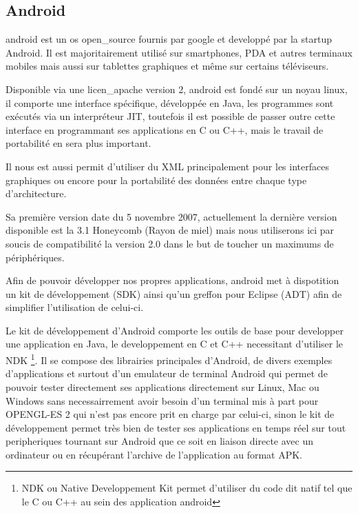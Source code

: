 \subsection{Android}

	\gls{android} est un \gls{os} \gls{open_source} fournis par \gls{google} et
	developpé par la startup Android.
	Il est majoritairement utilisé sur smartphones, PDA et autres terminaux
	mobiles mais aussi sur tablettes graphiques et même sur certains téléviseurs.
	
	Disponible via une \gls{licen_apache} version 2, \gls{android} est fondé sur un noyau \gls{linux}, il comporte une interface
	spécifique, développée en Java, les programmes sont exécutés via un
	interpréteur JIT, toutefois il est possible de passer outre cette interface en
	programmant ses applications en C ou C++, mais le travail de portabilité en
	sera plus important.
	
	Il nous est aussi permit d'utiliser du XML principalement pour les interfaces
	graphiques ou encore pour la portabilité des données entre chaque type
	d'architecture.
	
	Sa première version date du 5 novembre 2007, actuellement la dernière version
	disponible est la 3.1 Honeycomb (Rayon de miel) mais nous utiliserons ici par
	soucis de compatibilité la version 2.0 dans le but de toucher un maximums de
	périphériques.
	
	Afin de pouvoir développer nos propres applications, \gls{android} met à
	dispotition un kit de développement (SDK) ainsi qu'un greffon pour Eclipse
	(ADT) afin de simplifier l'utilisation de celui-ci.
	
	Le kit de développement d'Android comporte les outils de base pour developper une application en
	Java, le developpement en C et C++ necessitant d'utiliser le NDK \footnote{NDK
	ou Native Developpement Kit permet d'utiliser du code dit natif tel que le C
	ou C++ au sein des application \gls{android}}.
	Il se compose des librairies principales d'Android, de divers exemples
	d'applications et surtout d'un emulateur de terminal Android qui permet de
	pouvoir tester directement ses applications directement sur Linux, Mac ou
	Windows sans necessairrement avoir besoin d'un terminal mis à part pour
	OPENGL-ES 2 qui n'est pas encore prit en charge par celui-ci, sinon le kit de développement
	permet très bien de tester ses applications en temps réel sur tout
	peripheriques tournant sur Android que ce soit en liaison directe avec un
	ordinateur ou en récupérant l'archive de l'application au format APK.
	
